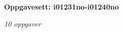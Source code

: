 \centerline{\bf Oppgavesett: i01231no-i01240no}
\vskip 10pt
\centerline{\it 10 oppgaver}\vskip 10pt
\vskip 10pt
